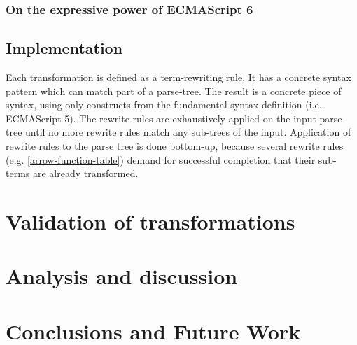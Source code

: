 \documentclass[10pt,a4paper]{article}
\begin{document}
\subsection{On the expressive power of ECMAScript 6}

\section{Implementation}
Each transformation is defined as a term-rewriting rule. It has a concrete syntax pattern which can match part of a parse-tree. The result is a concrete piece of syntax, using only constructs from the fundamental syntax definition (i.e. ECMAScript 5).
The rewrite rules are exhaustively applied on the input parse-tree until no more rewrite rules match any sub-trees of the input. Application of rewrite rules to the parse tree is done bottom-up, because several rewrite rules (e.g. \ref{arrow-function-table}) demand for successful completion that their sub-terms are already transformed.

\chapter{Validation of transformations}

\chapter{Analysis and discussion}

\chapter{Conclusions and Future Work}

{}

\end{document}
